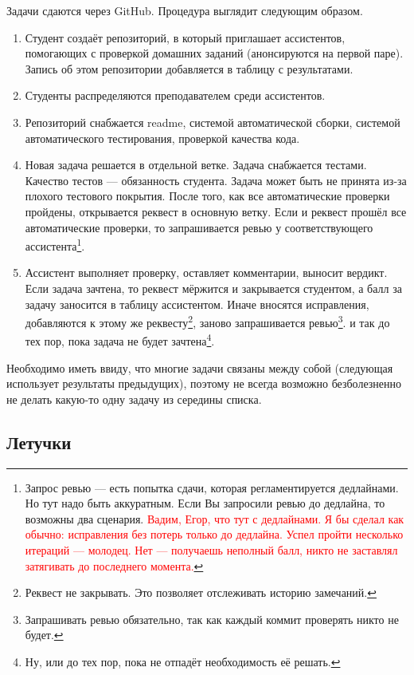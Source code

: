 Задачи сдаются через GitHub. Процедура выглядит следующим образом.
\begin{enumerate}
    \item Студент создаёт репозиторий, в который приглашает ассистентов, помогающих с проверкой домашних заданий (анонсируются на первой паре). Запись об этом репозитории добавляется в таблицу с результатами. 
    \item Студенты распределяются преподавателем среди ассистентов.
    \item Репозиторий снабжается readme, системой автоматической сборки, системой автоматического тестирования, проверкой качества кода. 
    \item Новая задача решается в отдельной ветке. Задача снабжается тестами. Качество тестов --- обязанность студента. Задача может быть не принята из-за плохого тестового покрытия. После того, как все автоматические проверки пройдены, открывается реквест в основную ветку. Если и реквест прошёл все автоматические проверки, то запрашивается ревью у соответствующего ассистента\footnote{Запрос ревью --- есть попытка сдачи, которая регламентируется дедлайнами. Но тут надо быть аккуратным. Если Вы запросили ревью до дедлайна, то возможны два сценария. \textcolor{red}{Вадим, Егор, что тут с дедлайнами. Я бы сделал как обычно: исправления без потерь только до дедлайна. Успел пройти несколько итераций --- молодец. Нет --- получаешь неполный балл, никто не заставлял затягивать до последнего момента.}}. 
    \item Ассистент выполняет проверку, оставляет комментарии, выносит вердикт. Если задача зачтена, то реквест мёржится и закрывается студентом, а балл за задачу заносится в таблицу ассистентом. Иначе вносятся исправления, добавляются к этому же реквесту\footnote{Реквест не закрывать. Это позволяет отслеживать историю замечаний.}, заново запрашивается ревью\footnote{Запрашивать ревью обязательно, так как каждый коммит проверять никто не будет.}. и так до тех пор, пока задача не будет зачтена\footnote{Ну, или до тех пор, пока не отпадёт необходимость её решать.}.
\end{enumerate}

Необходимо иметь ввиду, что многие задачи связаны между собой (следующая использует результаты предыдущих), поэтому не всегда возможно безболезненно не делать какую-то одну задачу из середины списка.

\subsection{Летучки}

